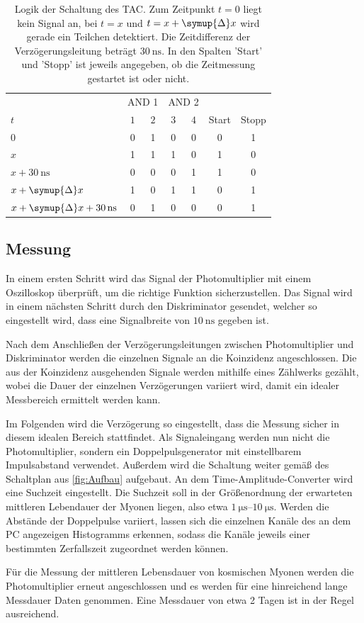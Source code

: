  \begin{table}
    \centering
    \caption{Logik der Schaltung des TAC. Zum Zeitpunkt $t=0$ liegt kein Signal an, bei $t=x$ und $t=x+\symup{\Delta}x$ wird gerade ein Teilchen detektiert. %
    Die Zeitdifferenz der Verzögerungsleitung beträgt $\qty{30}{\nano\second}$. In den Spalten 'Start' und 'Stopp' ist jeweils angegeben, ob die Zeitmessung %
    gestartet ist oder nicht.}
    \label{tab:Logik}
    \begin{tabular}{l | c c | c c | c c}
      \toprule
      {} & \multicolumn{2}{c|}{AND 1} & \multicolumn{2}{c|}{AND 2} & {} & {} \\
      $t$ & $1$ & $2$ & $3$ & $4$ & Start & Stopp \\
      \midrule
      $0$                                               & 0 & 1 & 0 & 0 & 0 & 1 \\
      $x$                                               & 1 & 1 & 1 & 0 & 1 & 0 \\
      {$x + \qty{30}{\nano\second}$}                    & 0 & 0 & 0 & 1 & 1 & 0 \\
      {$x + \symup{\Delta}x$}                           & 1 & 0 & 1 & 1 & 0 & 1 \\
      {$x + \symup{\Delta}x + \qty{30}{\nano\second}$}  & 0 & 1 & 0 & 0 & 0 & 1 \\      
      
      \bottomrule
    \end{tabular}
  \end{table}

  \subsection{Messung}
  \label{subsec:Messung}
  In einem ersten Schritt wird das Signal der Photomultiplier mit einem Oszilloskop überprüft, um die richtige Funktion sicherzustellen. Das Signal wird in einem nächsten Schritt durch den
  Diskriminator gesendet, welcher so eingestellt wird, dass eine Signalbreite von $\qty{10}{\nano\second}$ gegeben ist.

  Nach dem Anschließen der Verzögerungsleitungen zwischen Photomultiplier und Diskriminator werden die einzelnen Signale an die Koinzidenz angeschlossen. Die aus der Koinzidenz ausgehenden
  Signale werden mithilfe eines Zählwerks gezählt, wobei die Dauer der einzelnen Verzögerungen variiert wird, damit ein idealer Messbereich ermittelt werden kann.

  Im Folgenden wird die Verzögerung so eingestellt, dass die Messung sicher in diesem idealen Bereich stattfindet. Als Signaleingang werden nun nicht die Photomultiplier, sondern
  ein Doppelpulsgenerator mit einstellbarem Impulsabstand verwendet. Außerdem wird die Schaltung weiter gemäß des Schaltplan aus \autoref{fig:Aufbau} aufgebaut. An dem 
  Time-Amplitude-Converter wird eine Suchzeit eingestellt. Die Suchzeit soll in der Größenordnung der erwarteten mittleren Lebendauer der Myonen liegen, also etwa $\qtyrange{1}{10}{\micro\second}$.
  Werden die Abstände der Doppelpulse variiert, lassen sich die einzelnen Kanäle des an dem PC angezeigen Histogramms erkennen, sodass die Kanäle jeweils einer bestimmten Zerfallszeit
  zugeordnet werden können.

  Für die Messung der mittleren Lebensdauer von kosmischen Myonen werden die Photomultiplier erneut angeschlossen und es werden für eine hinreichend lange Messdauer Daten genommen. Eine
  Messdauer von etwa 2 Tagen ist in der Regel ausreichend.
